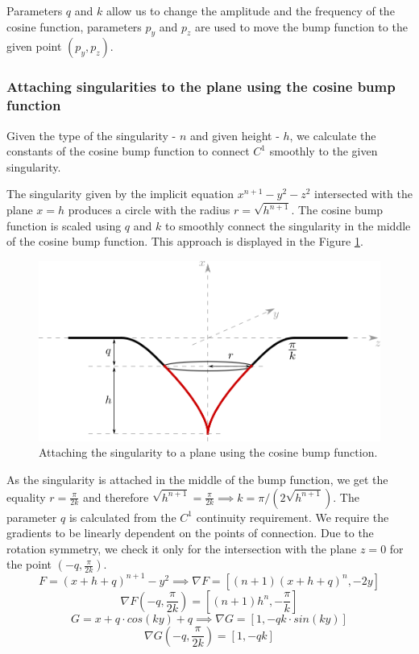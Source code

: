 Parameters $q$ and $k$ allow us to change the amplitude and the frequency of
the cosine function, parameters $p_y$ and $p_z$ are used to move the bump function
to the given point $(p_y, p_z)$.

\subsubsection*{Attaching singularities to the plane using the cosine bump function}

Given the type of the singularity - $n$ and given height - $h$, we calculate the
constants of the cosine bump function to connect $C^1$ smoothly to the given
singularity.

The singularity given by the implicit equation $x^{n+1}-y^2-z^2$ intersected with 
the plane $x=h$ produces a circle with the radius $r=\sqrt{h^{n+1}}$.
The cosine bump function is scaled using $q$ and $k$ to smoothly connect the
singularity in the middle of the cosine bump function. This approach is displayed
in the Figure \ref{img:25}. 

\begin{figure}
    \centerline{\includegraphics[scale=0.5]{images/img25}}
    \caption[Attaching the singularity to a plane using the cosine bump function]
    {Attaching the singularity to a plane using the cosine bump function.}
    \label{img:25}
\end{figure}

As the singularity is attached in the middle of the
bump function, we get the equality $r=\frac{\pi}{2k}$ and therefore
$\sqrt{h^{n+1}}=\frac{\pi}{2k} \implies k=\pi/(2\sqrt{h^{n+1}})$.
The parameter $q$ is calculated from the $C^1$ continuity requirement. We require the
gradients to be linearly dependent on the points of connection. Due to the rotation
symmetry, we check it only for the intersection with the plane $z=0$
for the point $(-q, \frac{\pi}{2k})$.
$$F=(x+h+q)^{n+1}-y^2 \implies \nabla F = \left[(n+1)(x+h+q)^n, -2y\right]$$
$$\nabla F \left(-q, \frac{\pi}{2k}\right) = \left[(n+1) h^n, -\frac{\pi}{k}\right]$$
$$G=x+q \cdot cos(k y)+q \implies \nabla G = \left[1, -qk \cdot sin(k y)\right]$$
$$\nabla G \left(-q, \frac{\pi}{2k}\right) = \left[1, -qk \right]$$


